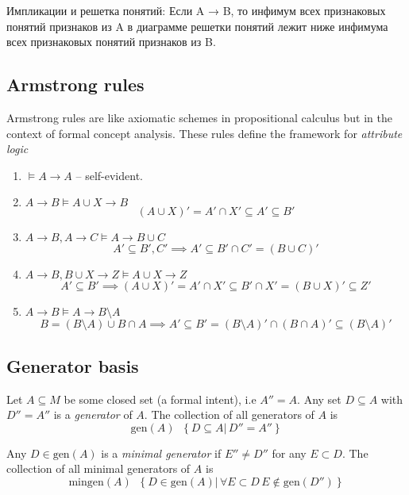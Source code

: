 \documentclass[a4paper]{article}
\newcommand{\obj}[1]{{\left\{ #1 \right \}}}
\newcommand{\brac}[1]{{\left ( #1 \right )}}
\newcommand{\induc}[1]{{\left . #1 \right \vert}}
\newcommand{\defn}{\mathop{\overset{\Delta}{=}}\nolimits}
\begin{document}
Импликации и решетка понятий: Если A → B, то инфимум всех признаковых понятий признаков из A в диаграмме решетки понятий лежит ниже инфимума всех признаковых понятий признаков из B.


\subsection{Armstrong rules} %
\label{sub:armstrong_rules}
Armstrong rules are like axiomatic schemes in propositional calculus but in the context of formal concept analysis. These rules define the framework for \emph{attribute logic}
\begin{enumerate}
	\item $\models A\to A$ -- self-evident.
	\item $A\to B\models A\cup X\to B$\hfill\[\brac{A\cup X}' = A'\cap X'\subseteq A'\subseteq B'\]
	\item $A\to B, A\to C\models A\to B\cup C$\hfill\[A'\subseteq B', C' \implies A'\subseteq B'\cap C' = \brac{B\cup C}'\]
	\item $A\to B, B\cup X\to Z\models A\cup X\to Z$\hfill
	\[ A'\subseteq B'\implies \brac{A\cup X}' = A'\cap X'  \subseteq B'\cap X' = \brac{B\cup X}' \subseteq Z'\]
	\item $A\to B\models A\to B\setminus A$\hfill \[B = (B\setminus A) \cup B\cap A \implies A'\subseteq B' = \brac{B\setminus A}' \cap \brac{B\cap A}'\subseteq \brac{B\setminus A}'\]
\end{enumerate}


\subsection{Generator basis} %
\label{sub:generator_basis}

Let $A\subseteq M$ be some closed set (a formal intent), i.e $A'' = A$. Any set $D\subseteq A$ with $D'' = A''$ is a \emph{generator} of $A$. The collection of all generators of $A$ is \[\text{gen}(A) \defn \obj{\induc{D\subseteq A}\, D'' = A'' }\]

Any $D\in \text{gen}(A)$ is a \emph{minimal generator} if $E'' \neq D''$ for any $E\subset D$. The collection of all minimal generators of $A$ is \[\text{mingen}(A) \defn \obj{ \induc{D\in \text{gen}(A)}\, \forall E\subset D\, E\notin \text{gen}(D'')}\]
\end{document}
